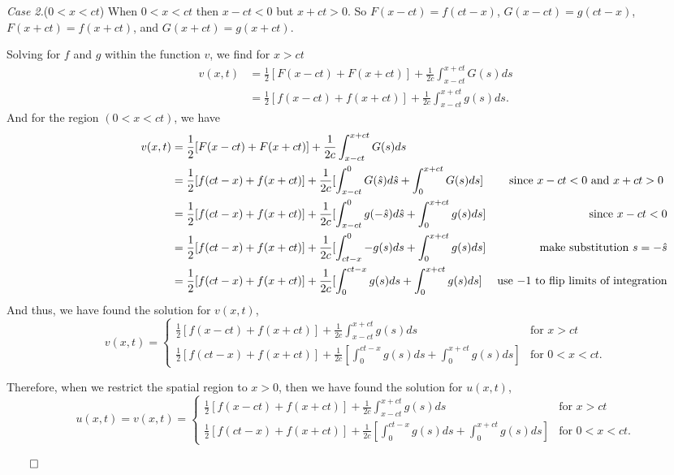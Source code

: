 \documentclass{article}
\begin{document}
\vspace{2mm} 
\textit{Case 2.}(\(0<x<ct\)) When \(0<x<ct\) then \(x-ct<0\) but \(x+ct>0\). So \(F(x-ct) = f(ct-x)\), \(G(x-ct)=g(ct-x)\), \(F(x+ct)=f(x+ct)\), and \(G(x+ct)=g(x+ct)\). 

Solving for \(f\) and \(g\) within the function \(v\), we find for \(x>ct\)
\begin{align*}
v(x,t) &= \frac{1}{2}[F(x-ct)+F(x+ct)] + \frac{1}{2c} \int_{x-ct}^{x+ct} G(s) ds \\
&= \frac{1}{2}[f(x-ct)+f(x+ct)] + \frac{1}{2c} \int_{x-ct}^{x+ct} g(s) ds.
\end{align*}
And for the region \((0<x<ct)\), we have
\begin{align*}
\hspace{30mm} v(x,t) &= \frac{1}{2}[F(x-ct)+F(x+ct)] + \frac{1}{2c} \int_{x-ct}^{x+ct} G(s) ds && \\
&=  \frac{1}{2}[f(ct-x)+f(x+ct)] + \frac{1}{2c}[ \int_{x-ct}^{0} G(\hat s) d\hat s + \int_{0}^{x+ct} G(s) ds]  &\text{   since \(x-ct<0\) and \(x+ct>0\) }& \\
&=\frac{1}{2}[f(ct-x)+f(x+ct)] + \frac{1}{2c}[ \int_{x-ct}^{0} g(-\hat s)d \hat s+ \int_{0}^{x+ct} g(s) ds] &\text{ since }x-ct<0 & \\
&= \frac{1}{2}[f(ct-x)+f(x+ct)] + \frac{1}{2c}[ \int_{ct-x}^{0} -g(s)ds+ \int_{0}^{x+ct} g(s) ds]&\text{  make substitution } s=-\hat s\\
&= \frac{1}{2}[f(ct-x)+f(x+ct)] + \frac{1}{2c}[ \int_{0}^{ct-x} g(s)ds+ \int_{0}^{x+ct} g(s) ds] &\text{use \(-1\) to flip limits of integration}
\end{align*}
And thus, we have found the solution for \(v(x,t)\), 
\[
  v(x,t) =
  \begin{cases}
                                  \frac{1}{2}[f(x-ct)+f(x+ct)] + \frac{1}{2c} \int_{x-ct}^{x+ct} g(s) ds& \text{for } x>ct \\
                                   \frac{1}{2}[f(ct-x)+f(x+ct)] + \frac{1}{2c}[ \int_{0}^{ct-x} g(s)ds+ \int_{0}^{x+ct} g(s) ds]  & \text{for } 0<x<ct.
  \end{cases}   
\]

Therefore, when we restrict the spatial region to \(x>0\), then we have found the solution for \(u(x,t)\), 
\[
 u(x,t)=  v(x,t) =
  \begin{cases}
                                  \frac{1}{2}[f(x-ct)+f(x+ct)] + \frac{1}{2c} \int_{x-ct}^{x+ct} g(s) ds& \text{for } x>ct \\
                                   \frac{1}{2}[f(ct-x)+f(x+ct)] + \frac{1}{2c}[ \int_{0}^{ct-x} g(s)ds+ \int_{0}^{x+ct} g(s) ds]  & \text{for } 0<x<ct.
  \end{cases}   
\]
\begin{flushright}
\(\qed\)
\end{flushright}
\end{document}
